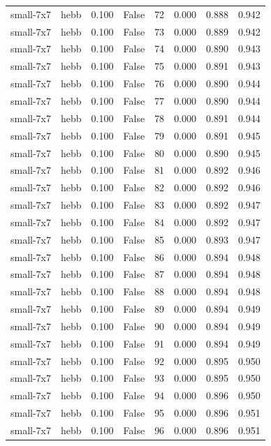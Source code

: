 \begin{tabular}{llrrrrrr}
small-7x7 & hebb & 0.100 & False & 72 & 0.000 & 0.888 & 0.942 \\
small-7x7 & hebb & 0.100 & False & 73 & 0.000 & 0.889 & 0.942 \\
small-7x7 & hebb & 0.100 & False & 74 & 0.000 & 0.890 & 0.943 \\
small-7x7 & hebb & 0.100 & False & 75 & 0.000 & 0.891 & 0.943 \\
small-7x7 & hebb & 0.100 & False & 76 & 0.000 & 0.890 & 0.944 \\
small-7x7 & hebb & 0.100 & False & 77 & 0.000 & 0.890 & 0.944 \\
small-7x7 & hebb & 0.100 & False & 78 & 0.000 & 0.891 & 0.944 \\
small-7x7 & hebb & 0.100 & False & 79 & 0.000 & 0.891 & 0.945 \\
small-7x7 & hebb & 0.100 & False & 80 & 0.000 & 0.890 & 0.945 \\
small-7x7 & hebb & 0.100 & False & 81 & 0.000 & 0.892 & 0.946 \\
small-7x7 & hebb & 0.100 & False & 82 & 0.000 & 0.892 & 0.946 \\
small-7x7 & hebb & 0.100 & False & 83 & 0.000 & 0.892 & 0.947 \\
small-7x7 & hebb & 0.100 & False & 84 & 0.000 & 0.892 & 0.947 \\
small-7x7 & hebb & 0.100 & False & 85 & 0.000 & 0.893 & 0.947 \\
small-7x7 & hebb & 0.100 & False & 86 & 0.000 & 0.894 & 0.948 \\
small-7x7 & hebb & 0.100 & False & 87 & 0.000 & 0.894 & 0.948 \\
small-7x7 & hebb & 0.100 & False & 88 & 0.000 & 0.894 & 0.948 \\
small-7x7 & hebb & 0.100 & False & 89 & 0.000 & 0.894 & 0.949 \\
small-7x7 & hebb & 0.100 & False & 90 & 0.000 & 0.894 & 0.949 \\
small-7x7 & hebb & 0.100 & False & 91 & 0.000 & 0.894 & 0.949 \\
small-7x7 & hebb & 0.100 & False & 92 & 0.000 & 0.895 & 0.950 \\
small-7x7 & hebb & 0.100 & False & 93 & 0.000 & 0.895 & 0.950 \\
small-7x7 & hebb & 0.100 & False & 94 & 0.000 & 0.896 & 0.950 \\
small-7x7 & hebb & 0.100 & False & 95 & 0.000 & 0.896 & 0.951 \\
small-7x7 & hebb & 0.100 & False & 96 & 0.000 & 0.896 & 0.951 \\

\end{tabular}
